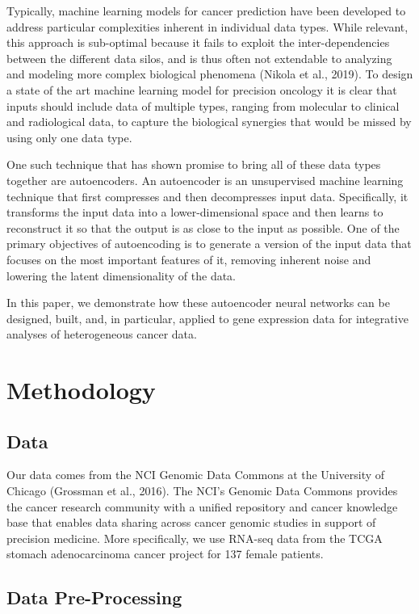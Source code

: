\documentclass{article}
\begin{document}
Typically, machine learning models for cancer prediction have been developed to address particular complexities inherent in individual data types. While relevant, this approach is sub-optimal because it fails to exploit the inter-dependencies between the different data silos, and is thus often not extendable to analyzing and modeling more complex biological phenomena (Nikola et al., 2019). To design a state of the art machine learning model for precision oncology it is clear that inputs should include data of multiple types, ranging from  molecular to clinical and radiological data, to capture the biological synergies that would be missed by using only one data type. 

One such technique that has shown promise to bring all of these data types together are autoencoders. An autoencoder is an unsupervised machine learning technique that first compresses and then decompresses input data. Specifically, it transforms the input data into a lower-dimensional space and then learns to reconstruct it so that the output is as close to the input as possible. One of the primary objectives of autoencoding is to generate a version of the input data that focuses on the most important features of it, removing inherent noise and lowering the latent dimensionality of the data.

In this paper, we demonstrate how these autoencoder neural  networks can be designed, built, and, in particular, applied to gene expression data for integrative analyses of heterogeneous cancer data. 

\section{Methodology}

\subsection{Data}
Our data comes from the NCI Genomic Data Commons at the University of Chicago (Grossman et al., 2016). The NCI's Genomic Data Commons provides the cancer research community with a unified repository and cancer knowledge base that enables data sharing across cancer genomic studies in support of precision medicine. More specifically, we use RNA-seq data from the TCGA stomach adenocarcinoma cancer project for 137 female patients.


\subsection{Data Pre-Processing}
\end{document}
